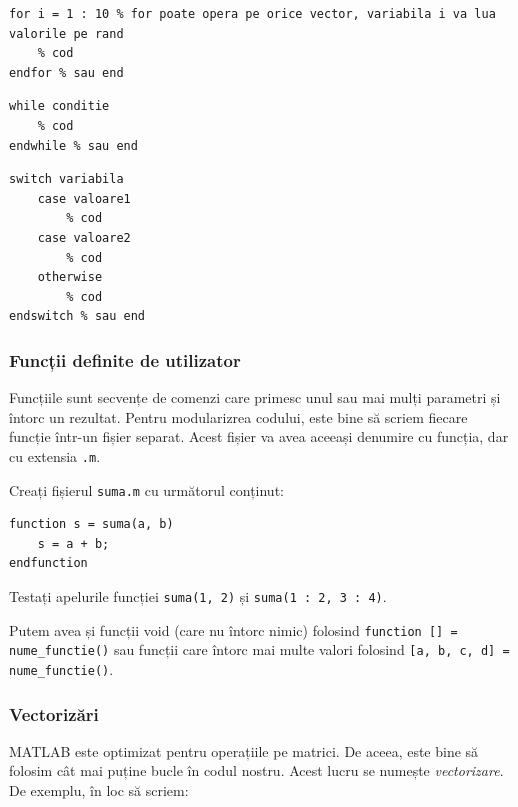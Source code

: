 \documentclass{exam}
\begin{document}
\begin{lstlisting}
for i = 1 : 10 % for poate opera pe orice vector, variabila i va lua valorile pe rand
	% cod
endfor % sau end
\end{lstlisting}

\begin{lstlisting}
while conditie
	% cod
endwhile % sau end
\end{lstlisting}

\begin{lstlisting}
switch variabila
	case valoare1
		% cod
	case valoare2
		% cod
	otherwise
		% cod
endswitch % sau end
\end{lstlisting}

\subsubsection{Funcții definite de utilizator}

\par Funcțiile sunt secvențe de comenzi care primesc unul sau mai mulți
parametri și întorc un rezultat. Pentru modularizrea codului, este bine să
scriem fiecare funcție într-un fișier separat. Acest fișier va avea aceeași
denumire cu funcția, dar cu extensia \verb|.m|.

\par Creați fișierul \verb|suma.m| cu următorul conținut:

\begin{lstlisting}
function s = suma(a, b)
	s = a + b;
endfunction
\end{lstlisting}

\par Testați apelurile funcției \verb|suma(1, 2)| și \verb|suma(1 : 2, 3 : 4)|.

\par Putem avea și funcții void (care nu întorc nimic) folosind
\verb|function [] = nume_functie()| sau funcții care întorc mai multe valori
folosind \verb|[a, b, c, d] = nume_functie()|.

\subsubsection{Vectorizări}

\par MATLAB este optimizat pentru operațiile pe matrici. De aceea, este bine să
folosim cât mai puține bucle în codul nostru. Acest lucru se numește
\textit{vectorizare}. De exemplu, în loc să scriem:
\end{document}
